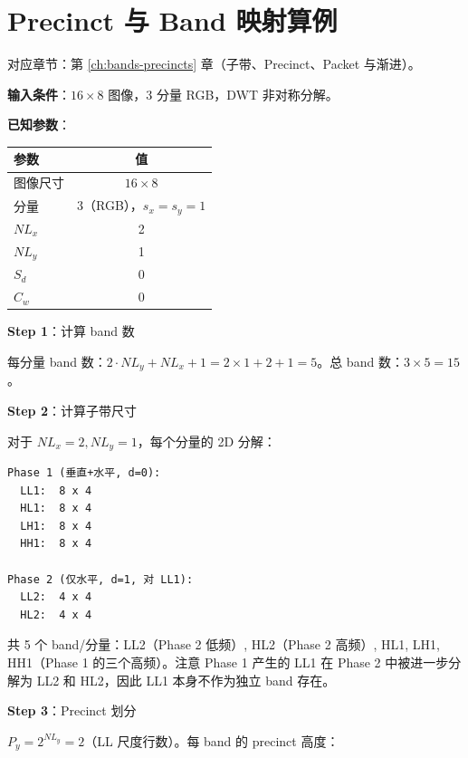 
\chapter{Precinct 与 Band 映射算例}\label{ex:precinct-band}

对应章节：第 \ref{ch:bands-precincts} 章（子带、Precinct、Packet 与渐进）。

\begin{examplebox}[title={例 1：4:4:4 图像的 IDS 构建}]

\textbf{输入条件}：$16 \times 8$ 图像，3 分量 RGB，DWT 非对称分解。

\medskip
\textbf{已知参数}：

\begin{tabular}{@{}lc@{}}
\toprule
参数 & 值 \\
\midrule
图像尺寸 & $16 \times 8$ \\
分量 & 3（RGB），$s_x = s_y = 1$ \\
$NL_x$ & 2 \\
$NL_y$ & 1 \\
$S_d$ & 0 \\
$C_w$ & 0 \\
\bottomrule
\end{tabular}

\medskip
\textbf{Step 1}：计算 band 数

每分量 band 数：$2 \cdot NL_y + NL_x + 1 = 2 \times 1 + 2 + 1 = 5$。总 band 数：$3 \times 5 = 15$。

\textbf{Step 2}：计算子带尺寸

对于 $NL_x = 2, NL_y = 1$，每个分量的 2D 分解：

\begin{lstlisting}[numbers=none]
Phase 1 (垂直+水平, d=0):
  LL1:  8 x 4
  HL1:  8 x 4
  LH1:  8 x 4
  HH1:  8 x 4

Phase 2 (仅水平, d=1, 对 LL1):
  LL2:  4 x 4
  HL2:  4 x 4
\end{lstlisting}

共 5 个 band/分量：LL2（Phase 2 低频）, HL2（Phase 2 高频）, HL1, LH1, HH1（Phase 1 的三个高频）。注意 Phase 1 产生的 LL1 在 Phase 2 中被进一步分解为 LL2 和 HL2，因此 LL1 本身不作为独立 band 存在。

\textbf{Step 3}：Precinct 划分

$P_y = 2^{NL_y} = 2$（LL 尺度行数）。每 band 的 precinct 高度：


\end{examplebox}

